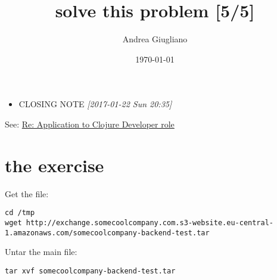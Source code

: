 \documentclass[11pt]{article}
\author{Andrea Giugliano}
\date{\today}
\title{solve this problem [5/5]}
\begin{document}
\maketitle
\tableofcontents

\begin{itemize}
\item CLOSING NOTE \textit{[2017-01-22 Sun 20:35]}
\end{itemize}
See: \href{msgid:CAGYbN5c=LC9aGeAdD1XPmFTcyZHmxju86SuBxPQiR4R4n\_eKsg@mail.gmail.com}{Re: Application to Clojure Developer role}
\section{the exercise}
\label{sec:orgb098c1d}
Get the file:
\begin{verbatim}
cd /tmp
wget http://exchange.somecoolcompany.com.s3-website.eu-central-1.amazonaws.com/somecoolcompany-backend-test.tar
\end{verbatim}

Untar the main file:

\begin{verbatim}
tar xvf somecoolcompany-backend-test.tar
\end{verbatim}
\end{document}
